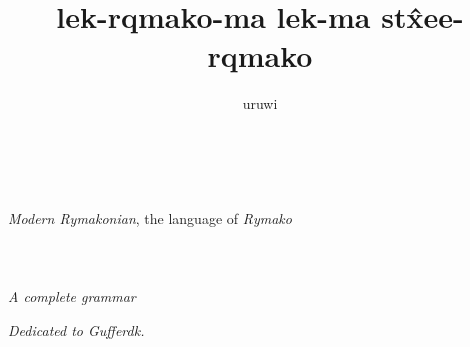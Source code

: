 \documentclass{book}
\title{lek-\bs{}rqmako-ma lek-ma st\^xee-\bs{}rqmako}
\author{uruwi}
\newcommand{\lname}{Modern Rymakonian}
\begin{document}
\pagecolor{Thistle!25}

\begin{titlepage}
    \makeatletter
    \begin{center}
        {\color{Orchid} \hprule \vspace{1.5ex} \\}
        {\Huge \kardinal \textcolor{Purple}{\@title} \\}
        {\large \textit{\lname}, the language of \textit{Rymako} \\}
        {\color{Orchid} \hprule \vspace{1.5ex} \\}
        \vspace{1.5cm}
        {\Large\bfseries \@author}\\[5pt]
        \vspace{2cm}
         \\[5pt]
        \emph{A complete grammar}\\[2cm]
        \vfill
        \vfill
        {\@date}
    \end{center}
    \makeatother
\end{titlepage}

\pagecolor{Thistle!15}

\begin{center}
    \textit{Dedicated to Gufferdk.}
\end{center}
\end{document}
